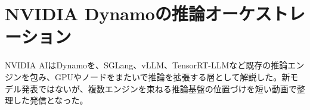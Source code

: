 \section{NVIDIA Dynamoの推論オーケストレーション}
NVIDIA AIはDynamoを、SGLang、vLLM、TensorRT-LLMなど既存の推論エンジンを包み、GPUやノードをまたいで推論を拡張する層として解説した。新モデル発表ではないが、複数エンジンを束ねる推論基盤の位置づけを短い動画で整理した発信となった。
